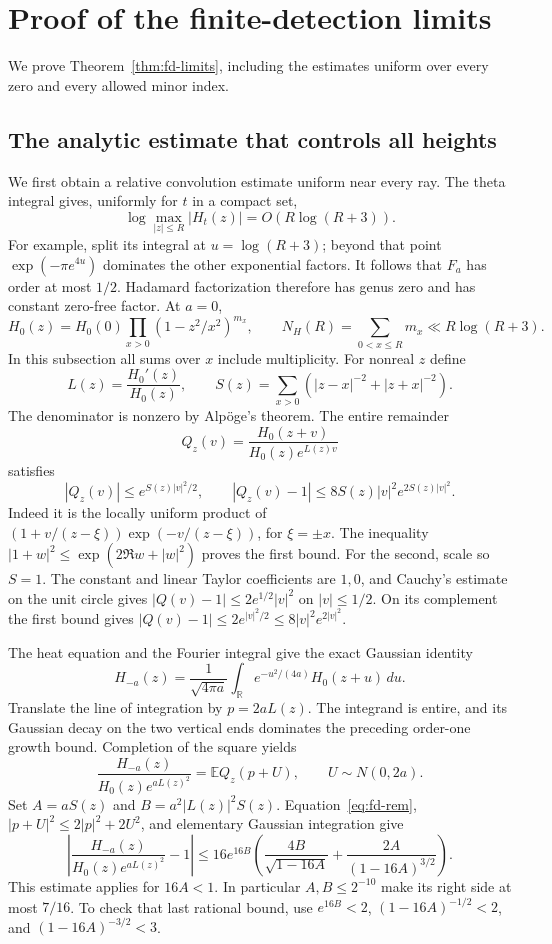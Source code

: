 \section{Proof of the finite-detection limits}
\label{sec:fd-main}
We prove Theorem~\ref{thm:fd-limits}, including the estimates uniform over every zero and every allowed minor index.

\subsection{The analytic estimate that controls all heights}

We first obtain a relative convolution estimate uniform near every ray.
The theta integral gives, uniformly for $t$ in a compact set,
\[
 \log\max_{|z|\le R}|H_t(z)|=O(R\log(R+3)).
\]
For example, split its integral at $u=\log(R+3)$; beyond that point
$\exp(-\pi e^{4u})$ dominates the other exponential factors.
It follows that $F_a$ has order at most $1/2$.  Hadamard factorization
therefore has genus zero and has constant zero-free factor.  At $a=0$,
\[
 H_0(z)=H_0(0)\prod_{x>0}(1-z^2/x^2)^{m_x},\qquad
 N_H(R)=\sum_{0<x\le R}m_x\ll R\log(R+3).
\]
In this subsection all sums over $x$ include multiplicity.
For nonreal $z$ define
\[
 L(z)=\frac{H_0'(z)}{H_0(z)},\qquad
 S(z)=\sum_{x>0}\left(|z-x|^{-2}+|z+x|^{-2}\right).
\]
The denominator is nonzero by Alp\"oge's theorem.  The entire remainder
\[
 Q_z(v)=\frac{H_0(z+v)}{H_0(z)e^{L(z)v}}
\]
satisfies
\begin{equation}\label{eq:fd-rem}
 |Q_z(v)|\le e^{S(z)|v|^2/2},\qquad
 |Q_z(v)-1|\le8S(z)|v|^2e^{2S(z)|v|^2}.
\end{equation}
Indeed it is the locally uniform product of
$(1+v/(z-\xi))\exp(-v/(z-\xi))$, for $\xi=\pm x$.
The inequality $|1+w|^2\le\exp(2\Re w+|w|^2)$ proves the first bound.
For the second, scale so $S=1$.  The constant and linear Taylor
coefficients are $1,0$, and Cauchy's estimate on the unit circle gives
$|Q(v)-1|\le2e^{1/2}|v|^2$ on $|v|\le1/2$.
On its complement the first bound gives
$|Q(v)-1|\le2e^{|v|^2/2}\le8|v|^2e^{2|v|^2}$.

The heat equation and the Fourier integral give the exact Gaussian identity
\[
 H_{-a}(z)=\frac1{\sqrt{4\pi a}}
             \int_{\mathbb R}e^{-u^2/(4a)}H_0(z+u)\,du.
\]
Translate the line of integration by $p=2aL(z)$.  The integrand is entire,
and its Gaussian decay on the two vertical ends dominates the preceding
order-one growth bound.  Completion of the square yields
\[
 \frac{H_{-a}(z)}{H_0(z)e^{aL(z)^2}}=\mathbb E Q_z(p+U),
 \qquad U\sim N(0,2a).
\]
Set $A=aS(z)$ and $B=a^2|L(z)|^2S(z)$.  Equation~\eqref{eq:fd-rem},
$|p+U|^2\le2|p|^2+2U^2$, and elementary Gaussian integration give
\begin{equation}\label{eq:fd-gauss}
 \left|\frac{H_{-a}(z)}{H_0(z)e^{aL(z)^2}}-1\right|
 \le16e^{16B}\left(
 \frac{4B}{\sqrt{1-16A}}+
 \frac{2A}{(1-16A)^{3/2}}\right).
\end{equation}
This estimate applies for $16A<1$.  In particular $A,B\le2^{-10}$
make its right side at most $7/16$.  To check that last rational bound,
use $e^{16B}<2$, $(1-16A)^{-1/2}<2$, and
$(1-16A)^{-3/2}<3$.

